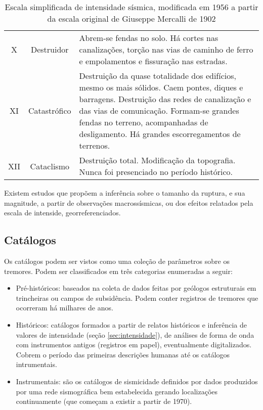\begin{table}[H]
\begin{center}
\begin{scriptsize}
\begin{tabular}{c|c|p{12cm}}
\\X 		&	Destruidor 		&	Abrem-se fendas no solo. Há cortes nas canalizações, torção nas vias de caminho 
								de ferro e empolamentos e fissuração nas estradas.
\\XI 		&	Catastrófico 	&	Destruição da quase totalidade dos edifícios, mesmo os mais sólidos. 
								Caem pontes, diques e barragens. Destruição das redes de canalização e das vias de comunicação. 
								Formam-se grandes fendas no terreno, acompanhadas de desligamento. Há grandes escorregamentos de terrenos.
\\XII 		&	Cataclismo 		&	Destruição total. Modificação da topografia. Nunca foi presenciado no período histórico. \\
\hline
\end{tabular}
\caption{Escala simplificada de intensidade sísmica, modificada em 1956 a partir da escala original de Giuseppe Mercalli de 1902}
\label{tab:mercalli}
\end{scriptsize}
\end{center}
\end{table}

Existem estudos \citep{bakun_1999} que propõem a inferência sobre o tamanho da ruptura, e sua
magnitude, a partir de observações macrossísmicas, ou dos efeitos relatados pela escala de intenside, georreferenciados.


\subsection{Catálogos}
\label{sec:catalogos}

Os catálogos podem ser vistos como uma coleção de parâmetros sobre os tremores. 
Podem ser classificados em três categorias \citep{woessner_catalog_2010} enumeradas a seguir:

\begin{itemize}\setlength{\itemsep}{0em}
	\item Pré-históricos: baseados na coleta de dados feitas por 
	geólogos estruturais em trincheiras ou campos de subsidência. Podem conter registros de tremores que ocorreram 
	há milhares de anos.
	\item Históricos: catálogos formados a partir de relatos históricos e inferência de valores de intensidade
	(seção \ref{sec:intensidade}), de análises de forma de onda com instrumentos antigos (registros em papel), eventualmente
	digitalizados.
	Cobrem o período das primeiras descrições humanas até os catálogos intrumentais.
	\item Instrumentais: são os catálogos de sismicidade definidos por dados produzidos por uma rede sismográfica bem estabelecida
	 gerando localizações continuamente (que começam a existir a partir de 1970).
\end{itemize} 

